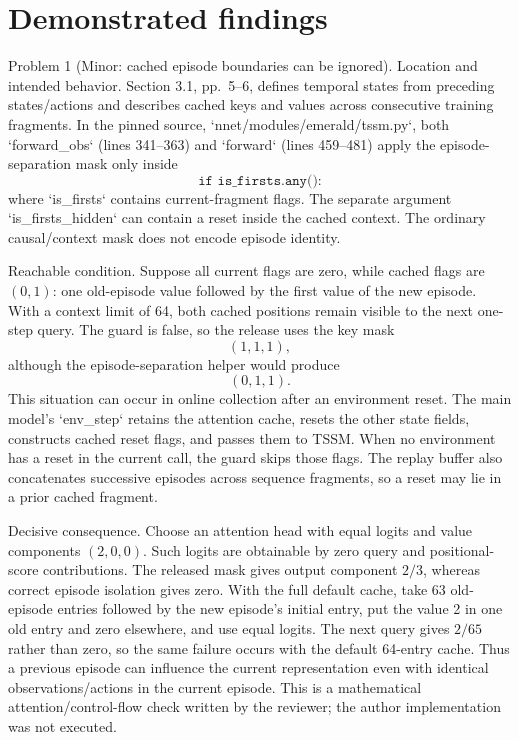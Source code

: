 \documentclass[10pt]{article}
\begin{document}
\section*{Demonstrated findings}
Problem 1 (Minor: cached episode boundaries can be ignored).  Location and intended behavior. Section 3.1, pp. 5–6, defines temporal states from preceding states/actions and describes cached keys and values across consecutive training fragments. In the pinned source, `nnet/modules/emerald/tssm.py`, both `forward\_obs` (lines 341–363) and `forward` (lines 459–481) apply the episode-separation mask only inside \[\texttt{if is\_firsts.any():}\] where `is\_firsts` contains current-fragment flags. The separate argument `is\_firsts\_hidden` can contain a reset inside the cached context. The ordinary causal/context mask does not encode episode identity.\par
Reachable condition. Suppose all current flags are zero, while cached flags are \((0,1)\): one old-episode value followed by the first value of the new episode. With a context limit of 64, both cached positions remain visible to the next one-step query. The guard is false, so the release uses the key mask \[(1,1,1),\] although the episode-separation helper would produce \[(0,1,1).\] This situation can occur in online collection after an environment reset. The main model’s `env\_step` retains the attention cache, resets the other state fields, constructs cached reset flags, and passes them to TSSM. When no environment has a reset in the current call, the guard skips those flags. The replay buffer also concatenates successive episodes across sequence fragments, so a reset may lie in a prior cached fragment.\par
Decisive consequence. Choose an attention head with equal logits and value components \((2,0,0)\). Such logits are obtainable by zero query and positional-score contributions. The released mask gives output component \(2/3\), whereas correct episode isolation gives zero. With the full default cache, take 63 old-episode entries followed by the new episode’s initial entry, put the value 2 in one old entry and zero elsewhere, and use equal logits. The next query gives \(2/65\) rather than zero, so the same failure occurs with the default 64-entry cache. Thus a previous episode can influence the current representation even with identical observations/actions in the current episode. This is a mathematical attention/control-flow check written by the reviewer; the author implementation was not executed.\par
\end{document}
